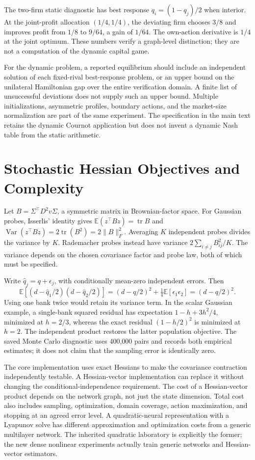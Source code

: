 \documentclass[ecta,draft]{econsocart}
\theoremstyle{definition}
\theoremstyle{remark}
\newcommand{\E}{\mathbb E}
\newcommand{\tr}{\operatorname{tr}}
\begin{document}
The two-firm static diagnostic has best response $q_i=(1-q_j)/2$ when interior. At the joint-profit allocation $(1/4,1/4)$, the deviating firm chooses $3/8$ and improves profit from $1/8$ to $9/64$, a gain of $1/64$. The own-action derivative is $1/4$ at the joint optimum. These numbers verify a graph-level distinction; they are not a computation of the dynamic capital game.

For the dynamic problem, a reported equilibrium should include an independent solution of each fixed-rival best-response problem, or an upper bound on the unilateral Hamiltonian gap over the entire verification domain. A finite list of unsuccessful deviations does not supply such an upper bound. Multiple initializations, asymmetric profiles, boundary actions, and the market-size normalization are part of the same experiment. The specification in the main text retains the dynamic Cournot application but does not invent a dynamic Nash table from the static arithmetic.

\section{Stochastic Hessian Objectives and Complexity}
Let $B=\Sigma^\top D^2v\Sigma$, a symmetric matrix in Brownian-factor space. For Gaussian probes, Isserlis' identity gives $\E(z^\top Bz)=\tr B$ and $\operatorname{Var}(z^\top Bz)=2\tr(B^2)=2\|B\|_F^2$. Averaging $K$ independent probes divides the variance by $K$. Rademacher probes instead have variance $2\sum_{i\ne j}B_{ij}^2/K$. The variance depends on the chosen covariance factor and probe law, both of which must be specified.

Write $\widehat q_j=q+\epsilon_j$, with conditionally mean-zero independent errors. Then
\[
 \E[(d-\widehat q_1/2)(d-\widehat q_2/2)]
 =(d-q/2)^2+\tfrac14\E[\epsilon_1\epsilon_2]=(d-q/2)^2.
\]
Using one bank twice would retain its variance term. In the scalar Gaussian example, a single-bank squared residual has expectation $1-h+3h^2/4$, minimized at $h=2/3$, whereas the exact residual $(1-h/2)^2$ is minimized at $h=2$. The independent product restores the latter population objective. The saved Monte Carlo diagnostic uses 400,000 pairs and records both empirical estimates; it does not claim that the sampling error is identically zero.

The core implementation uses exact Hessians to make the covariance contraction independently testable. A Hessian-vector implementation can replace it without changing the conditional-independence requirement. The cost of a Hessian-vector product depends on the network graph, not just the state dimension. Total cost also includes sampling, optimization, domain coverage, action maximization, and stopping at an agreed error level. A quadratic-neural representation with a Lyapunov solve has different approximation and optimization costs from a generic multilayer network. The inherited quadratic laboratory is explicitly the former; the new dense nonlinear experiments actually train generic networks and Hessian-vector estimators.
\end{document}

